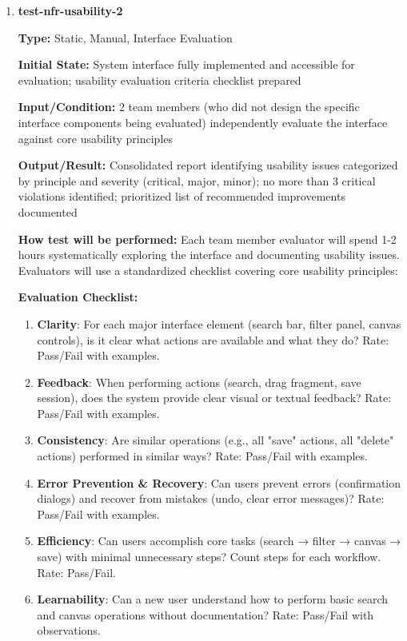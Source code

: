 \documentclass[12pt, titlepage]{article}
\begin{document}
\begin{enumerate}
\item \textbf{test-nfr-usability-2}

\textbf{Type:} Static, Manual, Interface Evaluation

\textbf{Initial State:} System interface fully implemented and accessible for evaluation; usability evaluation criteria checklist prepared

\textbf{Input/Condition:} 2 team members (who did not design the specific interface components being evaluated) independently evaluate the interface against core usability principles

\textbf{Output/Result:} Consolidated report identifying usability issues categorized by principle and severity (critical, major, minor); no more than 3 critical violations identified; prioritized list of recommended improvements documented

\textbf{How test will be performed:} Each team member evaluator will spend 1-2 hours systematically exploring the interface and documenting usability issues. Evaluators will use a standardized checklist covering core usability principles:

\textbf{Evaluation Checklist:}
\begin{enumerate}
\item \textbf{Clarity}: For each major interface element (search bar, filter panel, canvas controls), is it clear what actions are available and what they do? Rate: Pass/Fail with examples.
\item \textbf{Feedback}: When performing actions (search, drag fragment, save session), does the system provide clear visual or textual feedback? Rate: Pass/Fail with examples.
\item \textbf{Consistency}: Are similar operations (e.g., all "save" actions, all "delete" actions) performed in similar ways? Rate: Pass/Fail with examples.
\item \textbf{Error Prevention \& Recovery}: Can users prevent errors (confirmation dialogs) and recover from mistakes (undo, clear error messages)? Rate: Pass/Fail with examples.
\item \textbf{Efficiency}: Can users accomplish core tasks (search → filter → canvas → save) with minimal unnecessary steps? Count steps for each workflow. Rate: Pass/Fail.
\item \textbf{Learnability}: Can a new user understand how to perform basic search and canvas operations without documentation? Rate: Pass/Fail with observations.
\end{enumerate}


\end{enumerate}
\end{document}
